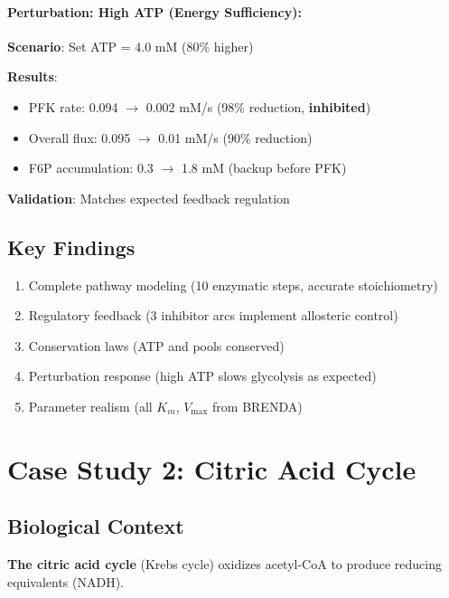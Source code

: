 \paragraph{Perturbation: High ATP (Energy Sufficiency):}

\textbf{Scenario}: Set ATP = 4.0 mM (80\% higher)

\textbf{Results}:

\begin{itemize}
    \item PFK rate: 0.094 $\to$ 0.002 mM/s (98\% reduction, \textbf{inhibited})
    \item Overall flux: 0.095 $\to$ 0.01 mM/s (90\% reduction)
    \item F6P accumulation: 0.3 $\to$ 1.8 mM (backup before PFK)
\end{itemize}

\textbf{Validation}: Matches expected feedback regulation \checkmark

\subsection{Key Findings}
\label{subsec:glycolysis-findings}

\begin{enumerate}
    \item Complete pathway modeling (10 enzymatic steps, accurate stoichiometry)
    \item Regulatory feedback (3 inhibitor arcs implement allosteric control)
    \item Conservation laws (ATP and  pools conserved)
    \item Perturbation response (high ATP slows glycolysis as expected)
    \item Parameter realism (all $K_m$, $V_{\max}$ from BRENDA)
\end{enumerate}

\section{Case Study 2: Citric Acid Cycle}
\label{sec:case-study-tca}

\subsection{Biological Context}
\label{subsec:tca-context}

\textbf{The citric acid cycle} (Krebs cycle) oxidizes acetyl-CoA to produce reducing equivalents (NADH).

